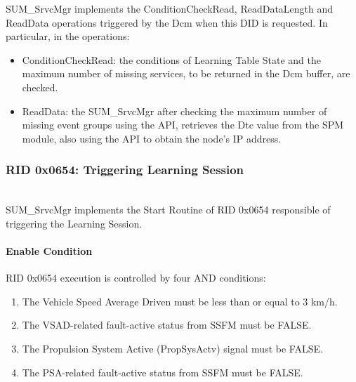 SUM\_SrvcMgr implements the ConditionCheckRead, ReadDataLength and ReadData operations triggered by the Dcm when this DID is requested.
In particular, in the operations:
\begin{itemize}
    \item ConditionCheckRead: the conditions of Learning Table State and the maximum number of missing services, to be returned in the Dcm buffer, are checked.
    \item ReadData: the SUM\_SrvcMgr after checking the maximum number of missing event groups using the  API, 
          retrieves the Dtc value from the SPM module, also using the  API to obtain the node's IP address.
\end{itemize}


{ }


\subsubsection{RID 0x0654: Triggering Learning Session}
\label{subsubsec:RID0x0654}
\\
SUM\_SrvcMgr implements the Start Routine of RID 0x0654 responsible of triggering the Learning Session.\\

\paragraph{Enable Condition}
RID 0x0654 execution is controlled by four AND conditions:

\begin{enumerate}
    \item The Vehicle Speed Average Driven must be less than or equal to 3 km/h.
    \item The VSAD-related fault-active status from SSFM must be FALSE.
    \item The Propulsion System Active (PropSysActv) signal must be FALSE.
    \item The PSA-related fault-active status from SSFM must be FALSE.
\end{enumerate}

